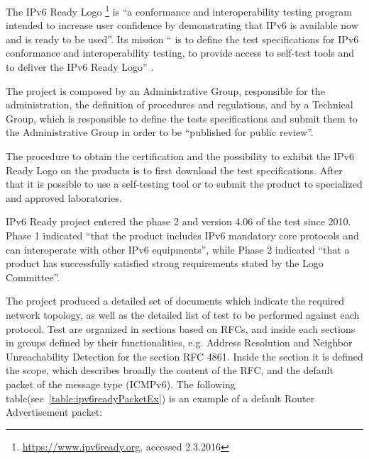 \documentclass[12pt]{article}
\begin{document}
The IPv6 Ready Logo \footnote{\url{https://www.ipv6ready.org}, accessed 2.3.2016} is ``a conformance and interoperability testing program intended to increase user confidence by demonstrating that IPv6 is available now and is ready to be used''. Its mission `` is to define the test specifications for IPv6 conformance and interoperability testing, to provide access to self-test tools and to deliver the IPv6 Ready Logo'' \cite{ipv6ready}.

The project is composed by an Administrative Group, responsible for the administration, the definition of procedures and regulations, and by a Technical Group, which is responsible to define the tests specifications and submit them to the Administrative Group in order to be ``published for public review''.

The procedure to obtain the certification and the possibility to exhibit the IPv6 Ready Logo on the products is to first download the test specifications. After that it is possible to use a self-testing tool or to submit the product to specialized and approved laboratories.

IPv6 Ready project entered the phase 2 and version 4.06 of the test since 2010. Phase 1 indicated ``that the product includes IPv6 mandatory core protocols and can interoperate with other IPv6 equipments'', while Phase 2 indicated ``that a product has successfully satisfied strong requirements stated by the Logo Committee''.

The project produced a detailed set of documents\cite{ipv6readyCore}\cite{ipv6readyCore2} which indicate the required network topology, as well as the detailed list of test to be performed against each protocol. Test are organized in sections based on RFCs, and inside each sections in groups defined by their functionalities, e.g. Address Resolution and Neighbor Unreachability Detection for the section RFC 4861. Inside the section it is defined the scope, which describes broadly the content of the RFC, and the default packet of the message type (ICMPv6). The following table(see~\ref{table:ipv6readyPacketEx}) is an example of a default Router Advertisement packet:
\end{document}

